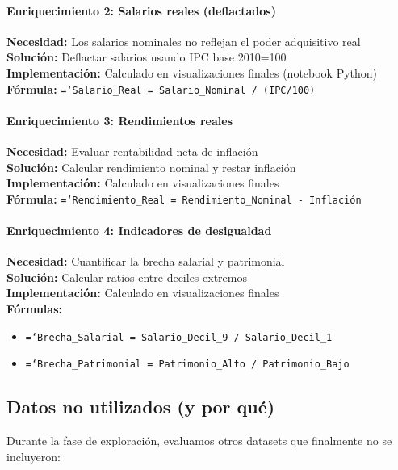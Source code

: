 \documentclass{article}
\let\oldtexttt\texttt  %
\renewcommand{\texttt}[1]{{\footnotesize\oldtexttt{\hyphenchar\font=`\-#1}}}  %
\begin{document}
\paragraph{Enriquecimiento 2: Salarios reales (deflactados)}
\textbf{Necesidad:} Los salarios nominales no reflejan el poder adquisitivo real\\
\textbf{Soluci\'on:} Deflactar salarios usando IPC base 2010=100\\
\textbf{Implementaci\'on:} Calculado en visualizaciones finales (notebook Python)\\
\textbf{F\'ormula:} \texttt{Salario\_Real = Salario\_Nominal / (IPC/100)}

\paragraph{Enriquecimiento 3: Rendimientos reales}
\textbf{Necesidad:} Evaluar rentabilidad neta de inflaci\'on\\
\textbf{Soluci\'on:} Calcular rendimiento nominal y restar inflaci\'on\\
\textbf{Implementaci\'on:} Calculado en visualizaciones finales\\
\textbf{F\'ormula:} \texttt{Rendimiento\_Real = Rendimiento\_Nominal - Inflaci\'on}

\paragraph{Enriquecimiento 4: Indicadores de desigualdad}
\textbf{Necesidad:} Cuantificar la brecha salarial y patrimonial\\
\textbf{Soluci\'on:} Calcular ratios entre deciles extremos\\
\textbf{Implementaci\'on:} Calculado en visualizaciones finales\\
\textbf{F\'ormulas:}
\begin{itemize}
    \item \texttt{Brecha\_Salarial = Salario\_Decil\_9 / Salario\_Decil\_1}
    \item \texttt{Brecha\_Patrimonial = Patrimonio\_Alto / Patrimonio\_Bajo}
\end{itemize}

\subsection{Datos no utilizados (y por qu\'e)}

Durante la fase de exploraci\'on, evaluamos otros datasets que finalmente no se incluyeron:
\end{document}
